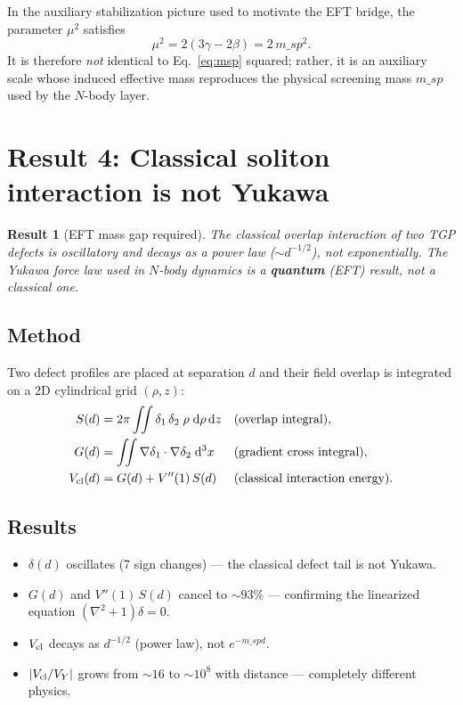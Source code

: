 \documentclass[11pt,a4paper]{article}
\def\msp{m\_sp}%
\newcommand{\msp}{m_{\rm sp}}
\newtheorem{result}{Result}
\begin{document}
\medskip\noindent
In the auxiliary stabilization picture used to motivate the EFT bridge, the
parameter $\mu^2$ satisfies
\[
  \mu^2 = 2(3\gamma - 2\beta) = 2\,\msp^2.
\]
It is therefore \emph{not} identical to Eq.~\eqref{eq:msp} squared; rather,
it is an auxiliary scale whose induced effective mass reproduces the physical
screening mass $\msp$ used by the $N$-body layer.

\section{Result 4: Classical soliton interaction is not Yukawa}
\label{sec:soliton-interaction}

\begin{result}[EFT mass gap required]
The classical overlap interaction of two TGP defects is oscillatory and
decays as a power law ($\sim d^{-1/2}$), not exponentially.  The Yukawa
force law used in $N$-body dynamics is a \textbf{quantum} (EFT) result,
not a classical one.
\end{result}

\subsection{Method}

Two defect profiles are placed at separation $d$ and their field overlap
is integrated on a 2D cylindrical grid $(\rho, z)$:
\begin{align}
  S(d) &= 2\pi \iint \delta_1\,\delta_2\;\rho\;\mathrm{d}\rho\,\mathrm{d}z
    & &\text{(overlap integral)},
    \label{eq:S}\\
  G(d) &= \iint \nabla\delta_1 \cdot \nabla\delta_2 \;\mathrm{d}^3x
    & &\text{(gradient cross integral)},
    \label{eq:G}\\
  V_{\rm cl}(d) &= G(d) + V''(1)\,S(d)
    & &\text{(classical interaction energy)}.
    \label{eq:Vcl}
\end{align}

\subsection{Results}

\begin{itemize}[nosep]
  \item $\delta(d)$ oscillates (7 sign changes) --- the classical defect
        tail is not Yukawa.
  \item $G(d)$ and $V''(1)\,S(d)$ cancel to $\sim93\%$ --- confirming
        the linearized equation $(\nabla^2 + 1)\delta = 0$.
  \item $V_{\rm cl}$ decays as $d^{-1/2}$ (power law), not $e^{-\msp d}$.
  \item $|V_{\rm cl}/V_Y|$ grows from $\sim16$ to $\sim10^8$ with distance
        --- completely different physics.
\end{itemize}
\end{document}
